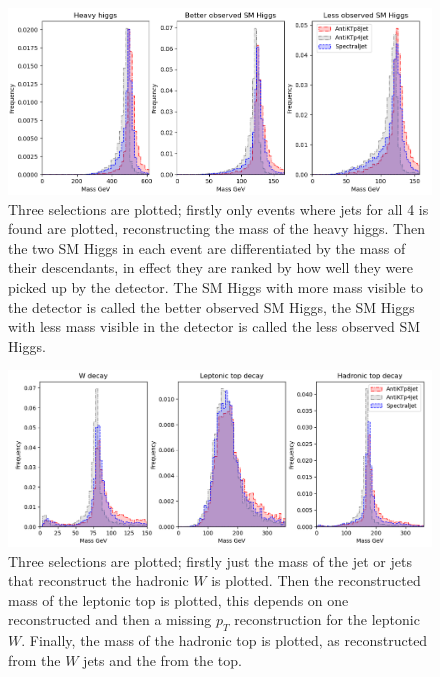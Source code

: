 \begin{figure}[htp]
    \includegraphics[width=1.\textwidth]{graphics/mass_peaks/heavy_long_correct_frequency.png}
    \caption{
Three selections are plotted; firstly only events where jets for all 4  is found
are plotted, reconstructing the mass of the heavy higgs.
Then the two SM Higgs in each event are differentiated by the mass of their descendants,
in effect they are ranked by how well they were picked up by the detector.
The SM Higgs with more mass visible to the detector is called the better observed SM Higgs,
the SM Higgs with less mass visible in the detector is called the less observed SM Higgs.
    }
\end{figure}    


\begin{figure}[htp]
    \includegraphics[width=1.\textwidth]{graphics/mass_peaks/top_long_correct_frequency.png}
    \caption{
        Three selections are plotted; firstly just the mass of the jet or jets that reconstruct the hadronic \(W\) is plotted.
        Then the reconstructed mass of the leptonic top is plotted,
        this depends on one reconstructed  and then a missing \(p_T\) reconstruction
        for the leptonic \(W\).
        Finally, the mass of the hadronic top is plotted, as reconstructed from the 
        \(W\) jets and the  from the top.
    }
\end{figure}    

